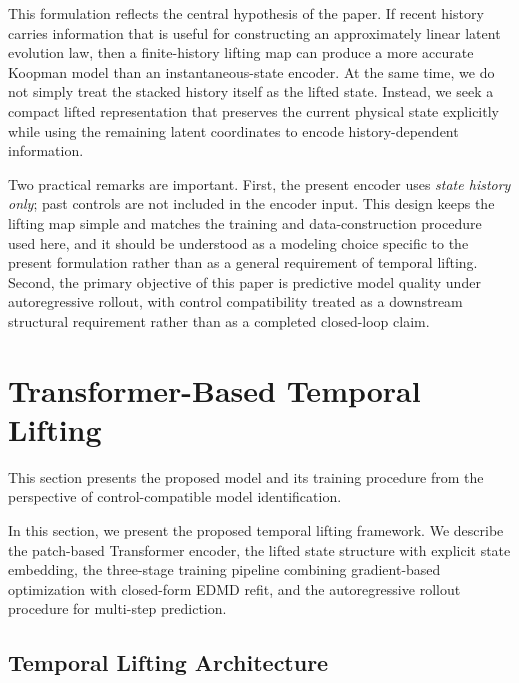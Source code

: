 \documentclass[journal]{IEEEtran}
\begin{document}
This formulation reflects the central hypothesis of the paper. If recent history carries information that is useful for constructing an approximately linear latent evolution law, then a finite-history lifting map can produce a more accurate Koopman model than an instantaneous-state encoder. At the same time, we do not simply treat the stacked history itself as the lifted state. Instead, we seek a compact lifted representation that preserves the current physical state explicitly while using the remaining latent coordinates to encode history-dependent information.

Two practical remarks are important. First, the present encoder uses \emph{state history only}; past controls are not included in the encoder input. This design keeps the lifting map simple and matches the training and data-construction procedure used here, and it should be understood as a modeling choice specific to the present formulation rather than as a general requirement of temporal lifting. Second, the primary objective of this paper is predictive model quality under autoregressive rollout, with control compatibility treated as a downstream structural requirement rather than as a completed closed-loop claim.

\section{Transformer-Based Temporal Lifting}
\label{sec:methodology}

This section presents the proposed model and its training procedure from the perspective of control-compatible model identification.

In this section, we present the proposed temporal lifting framework. We describe the patch-based Transformer encoder, the lifted state structure with explicit state embedding, the three-stage training pipeline combining gradient-based optimization with closed-form EDMD refit, and the autoregressive rollout procedure for multi-step prediction.

\subsection{Temporal Lifting Architecture}
\label{sec:temporal_lifting}
\end{document}
